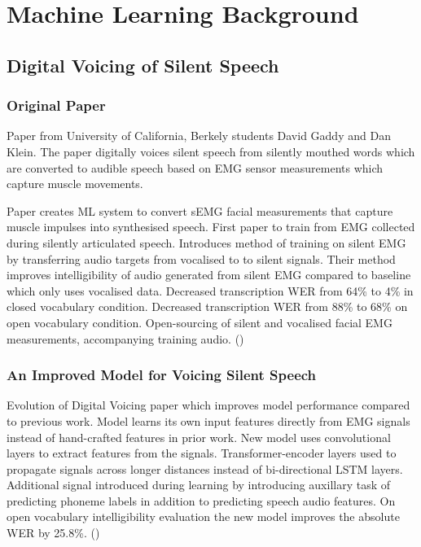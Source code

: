 \section{Machine Learning Background}

\subsection{Digital Voicing of Silent Speech}

\subsubsection{Original Paper}

Paper from University of California, Berkely students David Gaddy and Dan Klein.
The paper digitally voices silent speech from silently mouthed words which are
converted to audible speech based on EMG sensor measurements which capture muscle movements.

\iffalse
Other papers have used this approach to FILL REST OF THIS WITH REFERENCED TO SPEECH AND TO TEXT
FROM DIGITAL VOICING, MIT ALTER EGO 2018 SUMMARISED AND 60 PG VERSION AND OTHER SOURCES.
\fi

Paper creates ML system to convert sEMG facial measurements that capture muscle impulses into synthesised speech.
First paper to train from EMG collected during silently articulated speech.
Introduces method of training on silent EMG by transferring audio targets from vocalised to to silent signals.
Their method improves intelligibility of audio generated from silent EMG compared to baseline which only uses vocalised data.
Decreased transcription WER from 64\% to 4\% in closed vocabulary condition.
Decreased transcription WER from 88\% to 68\% on open vocabulary condition.
Open-sourcing of silent and vocalised facial EMG measurements, accompanying training audio.
(\cite{gaddy2020digital})

\subsubsection{An Improved Model for Voicing Silent Speech}

Evolution of Digital Voicing paper which improves model performance compared to previous work.
Model learns its own input features directly from EMG signals instead of hand-crafted features in prior work.
New model uses convolutional layers to extract features from the signals.
Transformer-encoder layers used to propagate signals across longer distances instead of bi-directional LSTM layers.
Additional signal introduced during learning by introducing auxillary task of predicting phoneme labels in addition to predicting speech audio features.
On open vocabulary intelligibility evaluation the new model improves the absolute WER by 25.8\%.
(\cite{gaddy2021improved})

